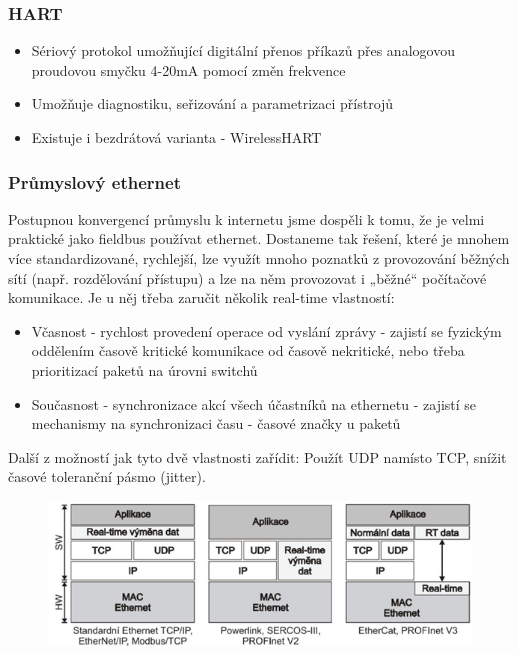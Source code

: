 \subsubsection*{HART}
\begin{itemize}
    \item Sériový protokol umožňující digitální přenos příkazů přes analogovou proudovou smyčku 4-20mA pomocí změn frekvence
    \item Umožňuje diagnostiku, seřizování a parametrizaci přístrojů
    \item Existuje i bezdrátová varianta - WirelessHART
\end{itemize}

\subsubsection*{Průmyslový ethernet}
Postupnou konvergencí průmyslu k internetu jsme dospěli k tomu, že je velmi praktické jako fieldbus používat ethernet. Dostaneme tak řešení, které je mnohem více standardizované, rychlejší, lze využít mnoho poznatků z provozování běžných sítí (např. rozdělování přístupu) a lze na něm provozovat i „běžné“ počítačové komunikace.
Je u něj třeba zaručit několik real-time vlastností:
\begin{itemize}
    \item Včasnost - rychlost provedení operace od vyslání zprávy - zajistí se fyzickým oddělením časově kritické komunikace od časově nekritické, nebo třeba prioritizací paketů na úrovni switchů
    \item Současnost - synchronizace akcí všech účastníků na ethernetu - zajistí se mechanismy na synchronizaci času - časové značky u paketů
\end{itemize}
Další z možností jak tyto dvě vlastnosti zařídit: Použít UDP namísto TCP, snížit časové toleranční pásmo (jitter).

\begin{figure}[h]
    \begin{center}
        \includegraphics[scale = 1]{img/Picture19.png}
    \end{center}
\end{figure}


